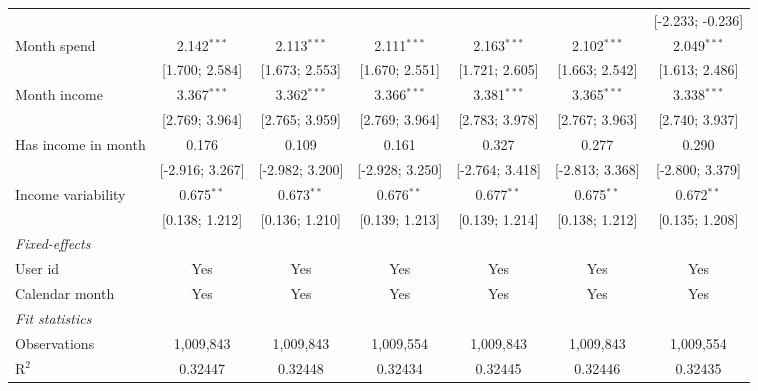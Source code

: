 \begin{table}[htbp]
\begin{threeparttable}[b]
\begin{tabular}{lcccccc}
                                        &                 &                 &                 &                 &                  & [-2.233; -0.236]\\   
         Month spend                    & 2.142$^{***}$   & 2.113$^{***}$   & 2.111$^{***}$   & 2.163$^{***}$   & 2.102$^{***}$    & 2.049$^{***}$\\   
                                        & [1.700; 2.584]  & [1.673; 2.553]  & [1.670; 2.551]  & [1.721; 2.605]  & [1.663; 2.542]   & [1.613; 2.486]\\   
         Month income                   & 3.367$^{***}$   & 3.362$^{***}$   & 3.366$^{***}$   & 3.381$^{***}$   & 3.365$^{***}$    & 3.338$^{***}$\\   
                                        & [2.769; 3.964]  & [2.765; 3.959]  & [2.769; 3.964]  & [2.783; 3.978]  & [2.767; 3.963]   & [2.740; 3.937]\\   
         Has income in month            & 0.176           & 0.109           & 0.161           & 0.327           & 0.277            & 0.290\\   
                                        & [-2.916; 3.267] & [-2.982; 3.200] & [-2.928; 3.250] & [-2.764; 3.418] & [-2.813; 3.368]  & [-2.800; 3.379]\\   
         Income variability             & 0.675$^{**}$    & 0.673$^{**}$    & 0.676$^{**}$    & 0.677$^{**}$    & 0.675$^{**}$     & 0.672$^{**}$\\   
                                        & [0.138; 1.212]  & [0.136; 1.210]  & [0.139; 1.213]  & [0.139; 1.214]  & [0.138; 1.212]   & [0.135; 1.208]\\   
         \midrule
         \emph{Fixed-effects}\\
         User id                        & Yes             & Yes             & Yes             & Yes             & Yes              & Yes\\  
         Calendar month                 & Yes             & Yes             & Yes             & Yes             & Yes              & Yes\\  
         \midrule
         \emph{Fit statistics}\\
         Observations                   & 1,009,843       & 1,009,843       & 1,009,554       & 1,009,843       & 1,009,843        & 1,009,554\\  
         R$^2$                          & 0.32447         & 0.32448         & 0.32434         & 0.32445         & 0.32446          & 0.32435\\  

\end{tabular}
\end{threeparttable}
\end{table}
